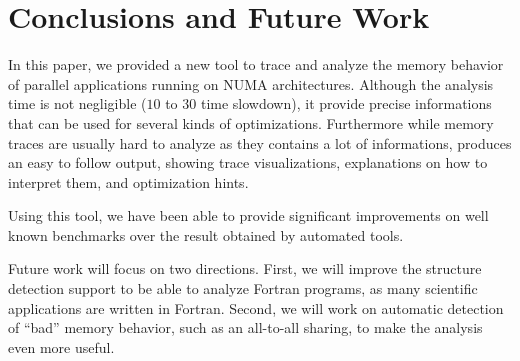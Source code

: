 
\section{Conclusions and Future Work}
\label{sec:concl}


In this paper, we provided a new tool to trace and analyze the memory
behavior of parallel applications running on NUMA architectures. Although the
analysis time is not negligible ($10$ to $30$ time slowdown), it provide precise informations that can be used for several kinds of
optimizations. Furthermore while memory traces are usually hard to analyze as
they contains a lot of informations, \TABARNAC produces an easy to follow
output, showing trace visualizations, explanations on how to interpret
them, and optimization hints.

Using this tool, we have been able to provide significant improvements on
well known benchmarks over the result obtained by automated tools.

Future work will focus on two directions. First, we will improve the
structure detection support to be able to analyze Fortran programs, as many
scientific applications are written in Fortran. Second, we will work
on automatic detection of ``bad'' memory behavior, such as an all-to-all sharing,
to make the analysis even more useful.

